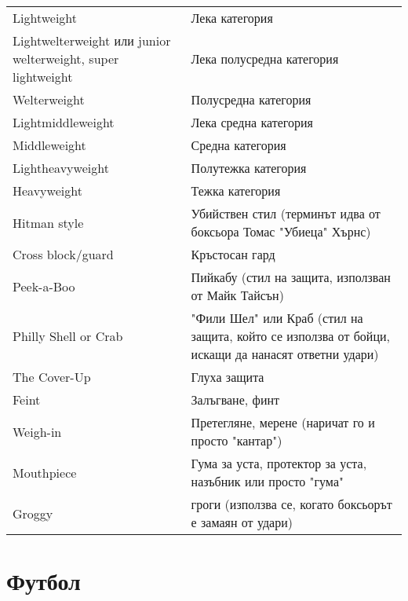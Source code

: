 \begin{longtable}{|p{}|p{}|}
Lightweight&Лека категория\\ 
Lightwelterweight или junior welterweight, super lightweight&Лека полусредна категория\\ 
Welterweight&Полусредна категория\\ 
Lightmiddleweight&Лека средна категория\\ 
Middleweight&Средна категория\\ 
Lightheavyweight&Полутежка категория\\ 
Heavyweight&Тежка категория\\ 
Hitman style&Убийствен стил (терминът идва от боксьора Томас "Убиеца" Хърнс)\\ 
Cross block/guard&Кръстосан гард\\ 
Peek-a-Boo&Пийкабу (стил на защита, използван от Майк Тайсън)\\ 
Philly Shell or Crab&"Фили Шел" или Краб (стил на защита, който се използва от бойци, искащи да нанасят ответни удари)\\ 
The Cover-Up&Глуха защита\\ 
Feint&Залъгване, финт\\ 
Weigh-in&Претегляне, мерене (наричат го и просто "кантар")\\ 
Mouthpiece&Гума за уста, протектор за уста, назъбник или просто "гума"\\ 
Groggy&гроги (използва се, когато боксьорът е замаян от удари)
\end{longtable}

\section{Футбол}

